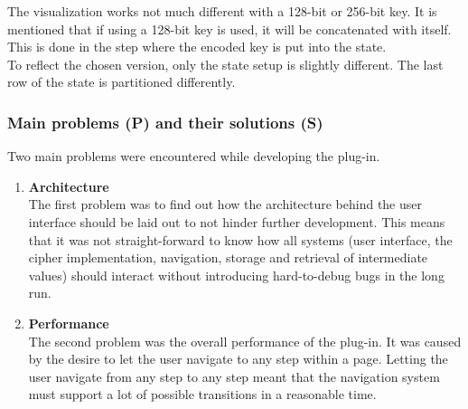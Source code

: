 \begin{enumerate}[label=(\labelenum{G}{{\arabic*}}), wide, labelwidth=!, labelindent=0pt]
     The visualization works not much different with a 128-bit or 256-bit key. It is mentioned that if using a 128-bit key is used, it will be concatenated with itself. This is done in the step where the encoded key is put into the state.\\
     To reflect the chosen version, only the state setup is slightly different. The last row of the state is partitioned differently.
  \end{enumerate}

\subsubsection{Main problems (P) and their solutions (S)}

Two main problems were encountered while developing the plug-in.

\begin{enumerate}[label=(\labelenum{P}{{\arabic*}}), wide, labelwidth=!, labelindent=0pt]
\setlength{\parskip}{0pt}

\item \textbf{Architecture}\\
The first problem was to find out how the architecture behind the user interface should be laid out to not hinder further development. This means that it was not straight-forward to know how all systems (user interface, the cipher implementation, navigation, storage and retrieval of intermediate values) should interact without introducing hard-to-debug bugs in the long run.

\item \textbf{Performance}\\
The second problem was the overall performance of the plug-in. It was caused by the desire to let the user navigate to any step within a page. Letting the user navigate from any step to any step meant that the navigation system must support a lot of possible transitions in a reasonable time.

\end{enumerate}

